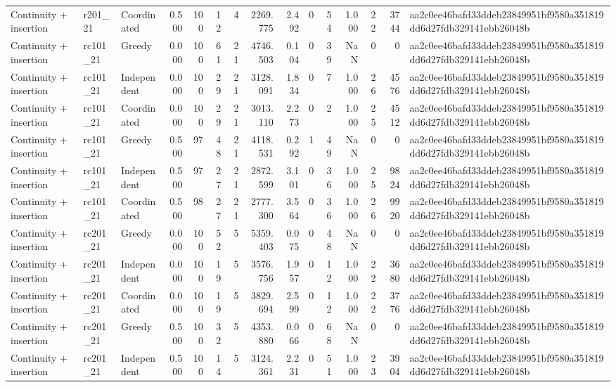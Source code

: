 \begin{tabular}{lllrrrrrrrrrrrl}
Continuity + insertion & r201\_21 & Coordinated & 0.500 & 100 & 12 & 4 & 2269.775 & 2.492 & 0 & 54 & 1.000 & 22 & 3744 & aa2c0ee46bafd33ddeb23849951bf9580a351819dd6d27fdb329141ebb26048b \\
Continuity + insertion & rc101\_21 & Greedy & 0.000 & 100 & 61 & 21 & 4746.503 & 0.104 & 0 & 39 & NaN & 0 & 0 & aa2c0ee46bafd33ddeb23849951bf9580a351819dd6d27fdb329141ebb26048b \\
Continuity + insertion & rc101\_21 & Independent & 0.000 & 100 & 29 & 21 & 3128.091 & 1.834 & 0 & 7 & 1.000 & 26 & 4576 & aa2c0ee46bafd33ddeb23849951bf9580a351819dd6d27fdb329141ebb26048b \\
Continuity + insertion & rc101\_21 & Coordinated & 0.000 & 100 & 29 & 21 & 3013.110 & 2.273 & 0 & 2 & 1.000 & 25 & 4512 & aa2c0ee46bafd33ddeb23849951bf9580a351819dd6d27fdb329141ebb26048b \\
Continuity + insertion & rc101\_21 & Greedy & 0.500 & 97 & 48 & 21 & 4118.531 & 0.292 & 1 & 49 & NaN & 0 & 0 & aa2c0ee46bafd33ddeb23849951bf9580a351819dd6d27fdb329141ebb26048b \\
Continuity + insertion & rc101\_21 & Independent & 0.500 & 97 & 27 & 21 & 2872.599 & 3.101 & 0 & 36 & 1.000 & 25 & 9824 & aa2c0ee46bafd33ddeb23849951bf9580a351819dd6d27fdb329141ebb26048b \\
Continuity + insertion & rc101\_21 & Coordinated & 0.500 & 98 & 27 & 21 & 2777.300 & 3.564 & 0 & 36 & 1.000 & 26 & 9920 & aa2c0ee46bafd33ddeb23849951bf9580a351819dd6d27fdb329141ebb26048b \\
Continuity + insertion & rc201\_21 & Greedy & 0.000 & 100 & 52 & 5 & 5359.403 & 0.075 & 0 & 48 & NaN & 0 & 0 & aa2c0ee46bafd33ddeb23849951bf9580a351819dd6d27fdb329141ebb26048b \\
Continuity + insertion & rc201\_21 & Independent & 0.000 & 100 & 19 & 5 & 3576.756 & 1.957 & 0 & 12 & 1.000 & 22 & 3680 & aa2c0ee46bafd33ddeb23849951bf9580a351819dd6d27fdb329141ebb26048b \\
Continuity + insertion & rc201\_21 & Coordinated & 0.000 & 100 & 19 & 5 & 3829.694 & 2.599 & 0 & 12 & 1.000 & 22 & 3776 & aa2c0ee46bafd33ddeb23849951bf9580a351819dd6d27fdb329141ebb26048b \\
Continuity + insertion & rc201\_21 & Greedy & 0.500 & 100 & 32 & 5 & 4353.880 & 0.066 & 0 & 68 & NaN & 0 & 0 & aa2c0ee46bafd33ddeb23849951bf9580a351819dd6d27fdb329141ebb26048b \\
Continuity + insertion & rc201\_21 & Independent & 0.500 & 100 & 14 & 5 & 3124.361 & 2.231 & 0 & 51 & 1.000 & 23 & 3904 & aa2c0ee46bafd33ddeb23849951bf9580a351819dd6d27fdb329141ebb26048b \\

\end{tabular}
